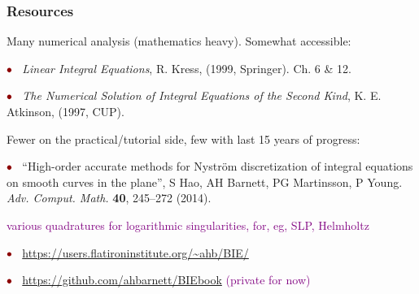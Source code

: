 \documentclass[t]{beamer}
\newcommand{\ft}[1]{\frametitle{#1}}
\newcommand{\com}[1]{{\scriptsize \textcolor{purple}{#1}}}      %
\newcommand{\vg}{\vspace{2ex}}
\newcommand{\hg}{\vspace{0.5ex}}
\newcommand{\rb}{\ensuremath{\textcolor{darkred}{\bullet\;}}\ }
\begin{document}
\begin{frame}\ft{Resources}  %

Many numerical analysis (mathematics heavy). Somewhat accessible:

\hg

\rb {\em Linear Integral Equations}, R. Kress, (1999, Springer). Ch. 6 \& 12.

\hg

\rb {\em The Numerical Solution of Integral Equations of the Second Kind},
K. E. Atkinson, (1997, CUP).




\vg

Fewer on the practical/tutorial side, few with last 15 years of progress:

\hg

\rb ``High-order accurate methods for Nystr\"om discretization of integral equations on smooth curves in the plane'', S Hao, AH Barnett, PG Martinsson, P Young.
{\em Adv. Comput. Math.} {\bf 40}, 245--272 (2014).

\hfill \com{various quadratures for logarithmic singularities,
  for, eg, SLP, Helmholtz}

\hg

\rb \url{https://users.flatironinstitute.org/~ahb/BIE/}

\hg

\rb \url{https://github.com/ahbarnett/BIEbook} \hfill \com{(private for now)}

\end{frame}
\end{document}
